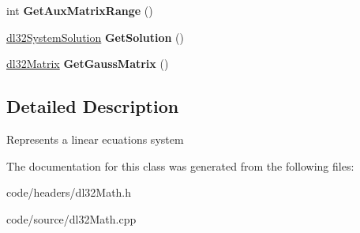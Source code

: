 \begin{DoxyCompactItemize}
\item 
\hypertarget{classdl32_ecuations_system_a5091f55dc1862ff3b3af33f6fe467b0a}{int {\bfseries Get\-Aux\-Matrix\-Range} ()}\label{classdl32_ecuations_system_a5091f55dc1862ff3b3af33f6fe467b0a}

\item 
\hypertarget{classdl32_ecuations_system_a198aa0e52856922b4f77dda2db204fe8}{\hyperlink{structdl32_system_solution}{dl32\-System\-Solution} {\bfseries Get\-Solution} ()}\label{classdl32_ecuations_system_a198aa0e52856922b4f77dda2db204fe8}

\item 
\hypertarget{classdl32_ecuations_system_a2a16289a8e13e1a19bbc4a573909bc06}{\hyperlink{classdl32_matrix}{dl32\-Matrix} {\bfseries Get\-Gauss\-Matrix} ()}\label{classdl32_ecuations_system_a2a16289a8e13e1a19bbc4a573909bc06}

\end{DoxyCompactItemize}


\subsection{Detailed Description}
Represents a linear ecuations system 

The documentation for this class was generated from the following files\-:\begin{DoxyCompactItemize}
\item 
code/headers/dl32\-Math.\-h\item 
code/source/dl32\-Math.\-cpp\end{DoxyCompactItemize}
